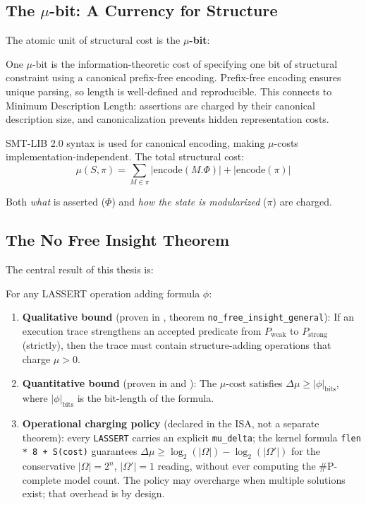 \subsection{The $\mu$-bit: A Currency for Structure}

The atomic unit of structural cost is the \textbf{$\mu$-bit}:

\begin{definition}[$\mu$-bit]
One $\mu$-bit is the information-theoretic cost of specifying one bit of structural constraint using a canonical prefix-free encoding. Prefix-free encoding ensures unique parsing, so length is well-defined and reproducible. This connects to Minimum Description Length: assertions are charged by their canonical description size, and canonicalization prevents hidden representation costs.
\end{definition}

SMT-LIB 2.0 syntax is used for canonical encoding, making $\mu$-costs implementation-independent. The total structural cost:
\[
\mu(S, \pi) = \sum_{M \in \pi} |\text{encode}(M.\Phi)| + |\text{encode}(\pi)|
\]

Both \emph{what} is asserted ($\Phi$) and \emph{how the state is modularized} ($\pi$) are charged.

\subsection{The No Free Insight Theorem}

The central result of this thesis is:

\begin{theorem}
For any LASSERT operation adding formula $\phi$:
\begin{enumerate}
    \item \textbf{Qualitative bound} (proven in , theorem \texttt{no\_free\_insight\_general}): If an execution trace strengthens an accepted predicate from $P_{\text{weak}}$ to $P_{\text{strong}}$ (strictly), then the trace must contain structure-adding operations that charge $\mu > 0$.
    \item \textbf{Quantitative bound} (proven in  and ): The $\mu$-cost satisfies $\Delta\mu \ge |\phi|_{\text{bits}}$, where $|\phi|_{\text{bits}}$ is the bit-length of the formula.
    \item \textbf{Operational charging policy} (declared in the ISA, not a separate theorem): every \texttt{LASSERT} carries an explicit \texttt{mu\_delta}; the kernel formula \texttt{flen * 8 + S(cost)} guarantees $\Delta\mu \ge \log_2(|\Omega|) - \log_2(|\Omega'|)$ for the conservative $|\Omega|=2^n$, $|\Omega'|=1$ reading, without ever computing the \#P-complete model count. The policy may overcharge when multiple solutions exist; that overhead is by design.
\end{enumerate}
\end{theorem}


